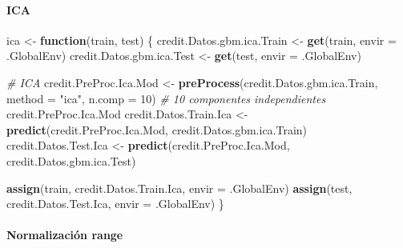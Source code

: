 \documentclass[
]{article}
\newenvironment{Shaded}{\begin{snugshade}}{\end{snugshade}}
\newcommand{\AttributeTok}[1]{\textcolor[rgb]{0.13,0.29,0.53}{#1}}
\newcommand{\CommentTok}[1]{\textcolor[rgb]{0.56,0.35,0.01}{\textit{#1}}}
\newcommand{\ControlFlowTok}[1]{\textcolor[rgb]{0.13,0.29,0.53}{\textbf{#1}}}
\newcommand{\DecValTok}[1]{\textcolor[rgb]{0.00,0.00,0.81}{#1}}
\newcommand{\FunctionTok}[1]{\textcolor[rgb]{0.13,0.29,0.53}{\textbf{#1}}}
\newcommand{\NormalTok}[1]{#1}
\newcommand{\OtherTok}[1]{\textcolor[rgb]{0.56,0.35,0.01}{#1}}
\newcommand{\StringTok}[1]{\textcolor[rgb]{0.31,0.60,0.02}{#1}}
\begin{document}
\hypertarget{ica}{%
\paragraph{ICA}\label{ica}}

\begin{Shaded}
\begin{Highlighting}[]
\NormalTok{ica }\OtherTok{\textless{}{-}} \ControlFlowTok{function}\NormalTok{(train, test) \{}
\NormalTok{  credit.Datos.gbm.ica.Train }\OtherTok{\textless{}{-}} \FunctionTok{get}\NormalTok{(train, }\AttributeTok{envir =}\NormalTok{ .GlobalEnv)}
\NormalTok{  credit.Datos.gbm.ica.Test }\OtherTok{\textless{}{-}} \FunctionTok{get}\NormalTok{(test, }\AttributeTok{envir =}\NormalTok{ .GlobalEnv)}
  
  \CommentTok{\# ICA}
\NormalTok{  credit.PreProc.Ica.Mod }\OtherTok{\textless{}{-}} \FunctionTok{preProcess}\NormalTok{(credit.Datos.gbm.ica.Train, }\AttributeTok{method =} \StringTok{"ica"}\NormalTok{, }\AttributeTok{n.comp =} \DecValTok{10}\NormalTok{)  }\CommentTok{\# 10 componentes independientes}
\NormalTok{  credit.PreProc.Ica.Mod}
\NormalTok{  credit.Datos.Train.Ica }\OtherTok{\textless{}{-}} \FunctionTok{predict}\NormalTok{(credit.PreProc.Ica.Mod, credit.Datos.gbm.ica.Train)}
\NormalTok{  credit.Datos.Test.Ica }\OtherTok{\textless{}{-}} \FunctionTok{predict}\NormalTok{(credit.PreProc.Ica.Mod, credit.Datos.gbm.ica.Test)}
  
  \FunctionTok{assign}\NormalTok{(train, credit.Datos.Train.Ica, }\AttributeTok{envir =}\NormalTok{ .GlobalEnv)}
  \FunctionTok{assign}\NormalTok{(test, credit.Datos.Test.Ica, }\AttributeTok{envir =}\NormalTok{ .GlobalEnv)}
\NormalTok{\}}
\end{Highlighting}
\end{Shaded}

\hypertarget{normalizaciuxf3n-range}{%
\paragraph{Normalización range}\label{normalizaciuxf3n-range}}
\end{document}
